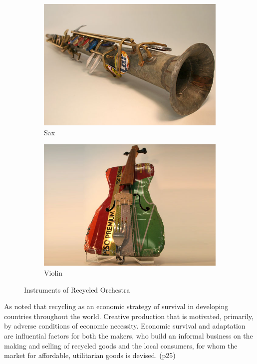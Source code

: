\begin{figure}
    \centering
    \begin{subfigure}[b]{0.47\textwidth}
        \includegraphics[width=\textwidth]{graphics/landfill_harmonic-sax.jpg}
        \caption{Sax}
        \label{fig:landfill_harmonic-sax}
    \end{subfigure}
    \begin{subfigure}[b]{0.47\textwidth}
        \includegraphics[width=\textwidth]{graphics/landfill_harmonic-violin.jpg}
        \caption{Violin}
        \label{fig:landfill_harmonic-violin}
    \end{subfigure}
    \caption{Instruments of Recycled Orchestra}\label{fig:animals}
\end{figure}

As noted that recycling as an economic strategy of survival in developing countries throughout the world. Creative production that is motivated, primarily, by adverse conditions of economic necessity. Economic survival and adaptation are influential factors for both the makers, who build an informal business on the making and selling of recycled goods and the local consumers, for whom the market for affordable, utilitarian goods is devised. (p25)

